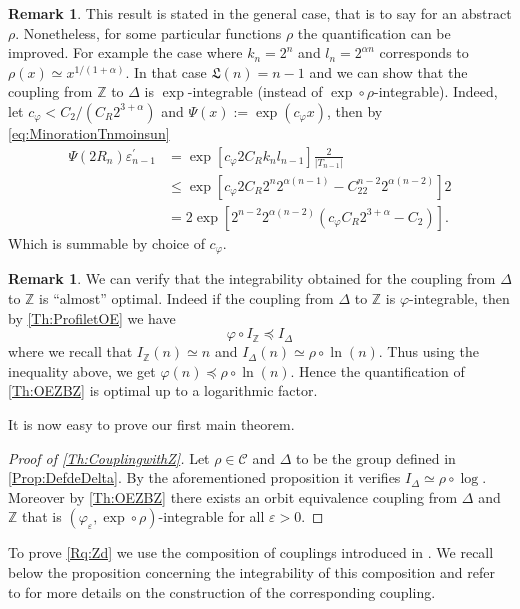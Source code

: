 \documentclass[english, 11pt, a4paper]{article}
\theoremstyle{definition}
\newtheorem{Rq}[Def]{Remark}
\numberwithin{equation}{section}
\newcommand{\bZ}{\mathbb{Z}}
\newcommand{\calC}{\mathcal{C}}
\newcommand{\BZ}{\Delta}
\newcommand{\epsZ}{\varepsilon^\prime}
\newcommand{\profile}{I}
\newcommand{\Landing}{\mathfrak{L}}
\begin{document}
\begin{Rq}
 This result is stated in the general case, that is to say for an abstract
 $\rho$. Nonetheless, for some particular functions $\rho$ the quantification
 can be improved. For example the case where $k_n= 2^n$ and $l_n=2^{\alpha n}$
 corresponds to $\rho(x)\simeq x^{1/(1+\alpha)}$. In that case $\Landing(n)=n-1$ and we
 can show that the coupling from $\bZ$ to $\BZ$ is $\exp$-integrable (instead of
 $\exp\circ \rho$-integrable). Indeed, 
 let $c_{\varphi}< C_2/(C_R2^{3+\alpha})$ and $\Psi(x):=\exp(c_{\varphi} x)$,
 then by \cref{eq:MinorationTnmoinsun}
 \begin{align*}
    \Psi(2R_n)\epsZ_{n-1} &= \exp\left[c_{\varphi} 2C_Rk_nl_{n-1}\right] \frac{2}{|T_{n-1}|}\\
    &\leq \exp \left[c_{\varphi}2C_R2^n2^{\alpha(n-1)}- C_22^{n-2}2^{\alpha(n-2)}\right]
      2\\ 
   &= 2\exp \left[2^{n-2}2^{\alpha(n-2)} \left(c_{\varphi}C_R2^{3+\alpha}- C_2  \right)\right].
 \end{align*}
 Which is summable by choice of $c_{\varphi}$.
\end{Rq}
\begin{Rq} We can verify that the integrability obtained for the coupling from
  $\BZ$ to $\bZ$ is “almost” optimal.
  Indeed if the coupling from $\BZ$ to $\bZ$ is
  $\varphi$-integrable, then by \cref{Th:ProfiletOE} we have
  \begin{equation*}
    \varphi \circ I_{\bZ} \preccurlyeq I_{\BZ} 
  \end{equation*}
  where we recall that $I_{\bZ}(n) \simeq n$ and $I_{\BZ}(n)\simeq
  \rho \circ\ln(n)$. Thus using the inequality above, we get $\varphi(n)
  \preccurlyeq \rho \circ \ln(n)$. Hence the quantification of
  \cref{Th:OEZBZ} is optimal up to a logarithmic factor.
\end{Rq}

It is now easy to prove our first main theorem.
\begin{proof}[Proof of \cref{Th:CouplingwithZ}]
  Let $\rho \in \calC$
  and $\BZ$ to be the
  group defined in \cref{Prop:DefdeDelta}. By the aforementioned proposition it
  verifies $\profile_{\BZ}\simeq \rho \circ \log$. Moreover by
  \cref{Th:OEZBZ} there exists an orbit equivalence coupling from $\BZ$ and
  $\bZ$ that is $(\varphi_{\varepsilon},\exp \circ \rho)$-integrable for all
  $\varepsilon>0$.
\end{proof}

To prove \cref{Rq:Zd} we use the composition of couplings introduced in
\cite{DKLMT}.
We recall below the proposition concerning the integrability of this composition
and refer to \cite[Sections 2.3 and 2.5]{DKLMT} for more details on the
construction of the corresponding coupling.
\end{document}
